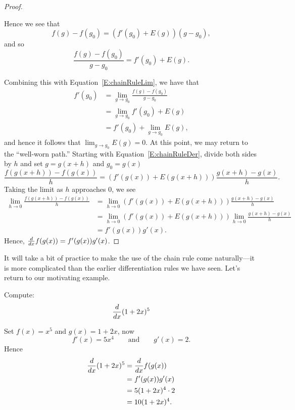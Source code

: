 \documentclass{ximera}
\begin{document}
\begin{proof}
\begin{image}
\end{image}

Hence we see that
\begin{equation}\label{E:chainRuleDer}
f(g)-f(g_0) = \left(f'(g_0) + E(g)\right)(g-g_0),
\end{equation}
and so
\[
\frac{f(g)-f(g_0)}{g-g_0} = f'(g_0) + E(g).
\]


Combining this with Equation~\ref{E:chainRuleLim}, we have that
\begin{align*}
f'(g_0) &= \lim_{g\to g_0}\frac{f(g)-f(g_0)}{g-g_0} \\
&= \lim_{g\to g_0}f'(g_0) + E(g)\\
&= f'(g_0) + \lim_{g\to g_0} E(g),
\end{align*}
and hence it follows that $\lim_{g\to g_0} E(g) = 0$. At this point,
we may return to the ``well-worn path.'' Starting with
Equation~\ref{E:chainRuleDer}, divide both sides by $h$ and set
$g=g(x+h)$ and $g_0=g(x)$
\[
\frac{f(g(x+h))-f(g(x))}{h} = \left(f'(g(x)) +
E(g(x+h))\right)\frac{g(x+h)-g(x)}{h}.
\]
Taking the limit as $h$ approaches $0$, we see 
\begin{align*}
\lim_{h\to 0}\frac{f(g(x+h))-f(g(x))}{h} &= \lim_{h\to 0}\left(f'(g(x))
+ E(g(x+h))\right)\frac{g(x+h)-g(x)}{h}\\
&= \lim_{h\to 0}\left(f'(g(x))
+ E(g(x+h))\right)\lim_{h\to 0}\frac{g(x+h)-g(x)}{h}\\
&= f'(g(x))g'(x).
\end{align*}
Hence, $\frac{d}{dx} f(g(x))= f'(g(x))g'(x)$.
\end{proof}


It will take a bit of practice to make the use of the chain rule come
naturally---it is more complicated than the earlier differentiation
rules we have seen. Let's return to our motivating example.

\begin{example}
Compute:
\[
\frac{d}{dx} (1+2x)^5
\]


Set $f(x) = x^5$ and $g(x) = 1+2x$, now
\[
f'(x) = 5x^4 \qquad\text{and}\qquad g'(x) = 2.
\]
Hence
\begin{align*}
\frac{d}{dx} (1+2x)^5 &= \frac{d}{dx} f(g(x))\\ 
&=f'(g(x))g'(x) \\
&= 5(1+2x)^4\cdot 2\\
&= 10(1+2x)^4.
\end{align*}
\end{example}
\end{document}
